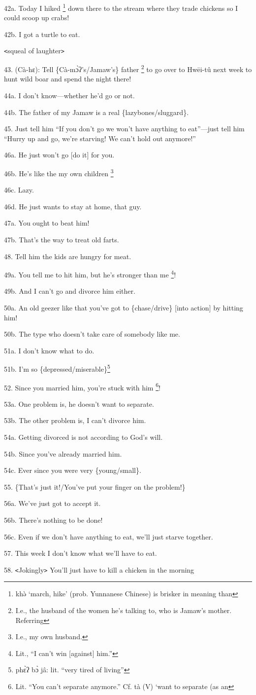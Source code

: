 42a. Today I hiked \footnote{khə̀ `march, hike' (prob. Yunnanese Chinese) is brisker in meaning than} down there to the stream where they trade chickens so I
could scoop up crabs!

42b. I got a turtle to eat.

\texttt{<}squeal of laughter\texttt{>}

43. (Cà-hɛ): Tell \{Cà-mɔ̀ʔ's/Jamaw's\} father \footnote{I.e., the husband of the women he's talking to, who is Jamaw's mother. Referring} to go over to Hwēi-tû
next week to hunt wild boar and spend the night there!

44a. I don't know---whether he'd go or not.

44b. The father of my Jamaw is a real \{lazybones/sluggard\}.

45. Just tell him ``If you don't go we won't have anything to eat''---just tell
him ``Hurry up and go, we're starving! We can't hold out anymore!''

46a. He just won't go [do it] for you.

46b. He's like the my own children \footnote{I.e., my own husband.}

46c. Lazy.

46d. He just wants to stay at home, that guy.

47a. You ought to beat him!

47b. That's the way to treat old farts.

48. Tell him the kids are hungry for meat.

49a. You tell me to hit him, but he's stronger than me \footnote{Lit., ``I can't win [against] him.''}!

49b. And I can't go and divorce him either.

50a. An old geezer like that you've got to \{chase/drive\} [into action] by hitting
him!

50b. The type who doesn't take care of somebody like me.

51a. I don't know what to do.

51b. I'm so \{depressed/miserable\}\.\footnote{phɛ̀ʔ bɔ̀ jâ: lit. ``very tired of living''}

52. Since you married him, you're stuck with him \footnote{Lit. ``You can't separate anymore.'' Cf. tà (V) `want to separate (as an}!

53a. One problem is, he doesn't want to separate.

53b. The other problem is, I can't divorce him.

54a. Getting divorced is not according to God's will.

54b. Since you've already married him.

54c. Ever since you were very \{young/small\}.

55. \{That's just it!/You've put your finger on the problem!\}

56a. We've just got to accept it.

56b. There's nothing to be done!

56c. Even if we don't have anything to eat, we'll just starve together.

57. This week I don't know what we'll have to eat.

58. \texttt{<}Jokingly\texttt{>} You'll just have to kill a chicken in the morning
